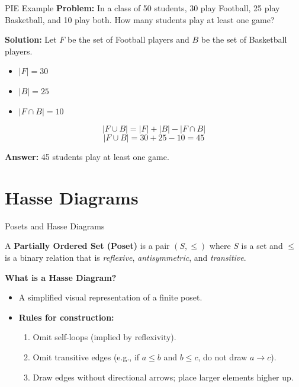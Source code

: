 \documentclass{beamer}
\begin{document}
\begin{frame}{PIE Example}
    \textbf{Problem:} In a class of 50 students, 30 play Football, 25 play Basketball, and 10 play both. How many students play at least one game?

    \vspace{0.4cm}
    \textbf{Solution:}
    Let $F$ be the set of Football players and $B$ be the set of Basketball players.
    \begin{itemize}
        \item $|F| = 30$
        \item $|B| = 25$
        \item $|F \cap B| = 10$
    \end{itemize}

    \[
    |F \cup B| = |F| + |B| - |F \cap B|
    \]
    \[
    |F \cup B| = 30 + 25 - 10 = 45
    \]

    \textbf{Answer:} 45 students play at least one game.
\end{frame}

\section{Hasse Diagrams}
\begin{frame}{Posets and Hasse Diagrams}
    \begin{definition}
        A \textbf{Partially Ordered Set (Poset)} is a pair $(S, \le)$ where $S$ is a set and $\le$ is a binary relation that is \textit{reflexive}, \textit{antisymmetric}, and \textit{transitive}.
    \end{definition}

    \vspace{0.3cm}
    \textbf{What is a Hasse Diagram?}
    \begin{itemize}
        \item A simplified visual representation of a finite poset.
        \item \textbf{Rules for construction:}
        \begin{enumerate}
            \item Omit self-loops (implied by reflexivity).
            \item Omit transitive edges (e.g., if $a \le b$ and $b \le c$, do not draw $a \to c$).
            \item Draw edges without directional arrows; place larger elements higher up.
        \end{enumerate}
    \end{itemize}
\end{frame}
\end{document}
